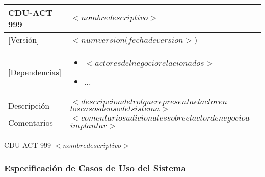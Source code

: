   \begin{Artefacto}[H]
    \centering
    \begin{tabular}{|p{3cm}|p{10cm}|}
        \hline
         \cellcolor{gray30}  CDU-ACT 999	&  $<nombre descriptivo>$\\ 
        \hline
         \cellcolor{gray30}  [Versión]	&  $<num version(fecha de version>$)\\   
         \hline
         \cellcolor{gray30}  [Dependencias] &  	\begin{itemize} \item $<actores del negocio relacionados>$\item	... \end{itemize}\\  

        \hline
         \cellcolor{gray30} Descripción	& $<descripcion del rol que representa el actor en$ $ los casos de uso del sistema >$ \\
        \hline
         \cellcolor{gray30}  Comentarios	&$<comentarios adicionales sobre el actor de negocio  a$ $ implantar>$\\   
        \hline
  
    \end{tabular}
\caption{CDU-ACT 999	$<nombre descriptivo>$ }
  \end{Artefacto}



\subsubsection{Especificación de Casos de Uso del Sistema}


